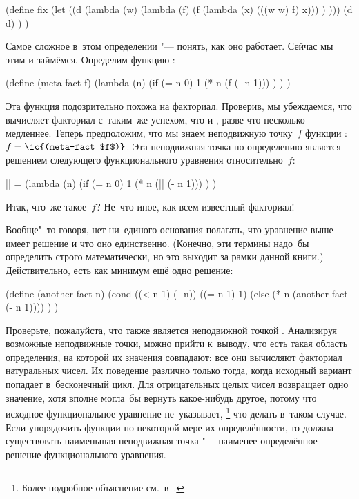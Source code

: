 
\begin{code:lisp}
(define fix
  (let ((d (lambda (w)
             (lambda (f)
               (f (lambda (x) (((w w) f) x))) ) )))
  (d d) ) )
\end{code:lisp}

Самое сложное в~этом определении "--- понять, как оно работает. Сейчас мы этим
и займёмся. Определим функцию :

\begin{code:lisp}[label=lisp1-2-omega/recursion/y-combinator/code:meta-fact]
(define (meta-fact f)
  (lambda (n)
    (if (= n 0) 1
        (* n (f (- n 1))) ) ) )
\end{code:lisp}

Эта функция подозрительно похожа на факториал. Проверив, мы убеждаемся, что
 вычисляет факториал с~таким~же успехом, что и ,
разве что несколько медленнее. Теперь предположим, что мы знаем неподвижную
точку~$f$ функции : $f = \text{\ic{(meta-fact $f$)}}$. Эта
неподвижная точка по определению является решением следующего функционального
уравнения относительно~$f$:

\begin{code:lisp}
|| = (lambda (n)
      (if (= n 0) 1
          (* n (|| (- n 1))) ) )
\end{code:lisp}

Итак, что~же такое~$f$? Не~что иное, как всем известный факториал!

Вообще"~то говоря, нет ни~единого основания полагать, что уравнение выше имеет
решение и что оно единственно. (Конечно, эти термины надо~бы определить строго
математически, но это выходит за рамки данной книги.) Действительно, есть как
минимум ещё одно решение:

\begin{code:lisp}
(define (another-fact n)
  (cond ((< n 1) (- n))
        ((= n 1) 1)
        (else (* n (another-fact (- n 1)))) ) )
\end{code:lisp}

Проверьте, пожалуйста, что  также является неподвижной точкой
. Анализируя возможные неподвижные точки, можно прийти к~выводу,
что есть такая область определения, на которой их значения совпадают: все они
вычисляют факториал натуральных чисел. Их поведение различно только тогда, когда
исходный вариант  попадает в~бесконечный цикл. Для отрицательных целых
чисел  возвращает одно значение, хотя вполне могла~бы вернуть
какое-нибудь другое, потому что исходное функциональное уравнение не~указывает,%
\footnote*{Более подробное объяснение см.~в~\cite{man74}.} что делать в~таком
случае. Если упорядочить функции по некоторой мере их определённости, то должна
существовать наименьшая неподвижная точка "--- наименее определённое решение
функционального уравнения.

